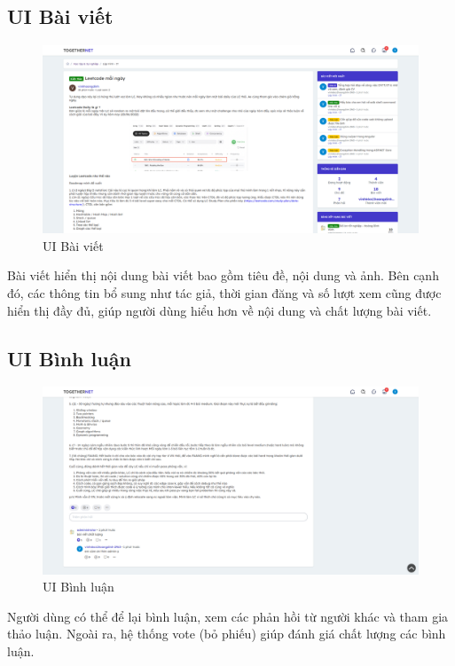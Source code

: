 \documentclass[../index.tex]{subfiles}
\begin{document}
    \subsection{UI Bài viết}
    \begin{figure}[H]
        \centering
        \includegraphics[width=1\linewidth]{figures/demo/post-detail-page.png}
        \caption{UI Bài viết}
    \end{figure}
    Bài viết hiển thị nội dung bài viết bao gồm tiêu đề, nội dung và ảnh. Bên
    cạnh đó, các thông tin bổ sung như tác giả, thời gian đăng và số lượt xem
    cũng được hiển thị đầy đủ, giúp người dùng hiểu hơn về nội dung và chất lượng
    bài viết.

    \subsection{UI Bình luận}
    \begin{figure}[H]
        \centering
        \includegraphics[width=1\linewidth]{figures/demo/post-detail-page-2.png}
        \caption{UI Bình luận}
    \end{figure}
    Người dùng có thể để lại bình luận, xem các phản hồi từ người khác và tham
    gia thảo luận. Ngoài ra, hệ thống vote (bỏ phiếu) giúp đánh giá chất lượng
    các bình luận.
\end{document}
